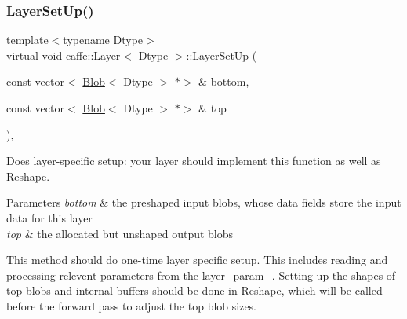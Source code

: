 \subsubsection{\texorpdfstring{Layer\+Set\+Up()}{LayerSetUp()}\hspace{0.1cm}{\footnotesize\ttfamily [2/2]}}
{\footnotesize\ttfamily template$<$typename Dtype$>$ \\
virtual void \mbox{\hyperlink{classcaffe_1_1_layer}{caffe\+::\+Layer}}$<$ Dtype $>$\+::Layer\+Set\+Up (\begin{DoxyParamCaption}\item[{const vector$<$ \mbox{\hyperlink{classcaffe_1_1_blob}{Blob}}$<$ Dtype $>$ $\ast$$>$ \&}]{bottom,  }\item[{const vector$<$ \mbox{\hyperlink{classcaffe_1_1_blob}{Blob}}$<$ Dtype $>$ $\ast$$>$ \&}]{top }\end{DoxyParamCaption})\hspace{0.3cm}{\ttfamily [inline]}, {\ttfamily [virtual]}}



Does layer-\/specific setup\+: your layer should implement this function as well as Reshape. 


\begin{DoxyParams}{Parameters}
{\em bottom} & the preshaped input blobs, whose data fields store the input data for this layer \\
\hline
{\em top} & the allocated but unshaped output blobs\\
\hline
\end{DoxyParams}
This method should do one-\/time layer specific setup. This includes reading and processing relevent parameters from the {\ttfamily layer\+\_\+param\+\_\+}. Setting up the shapes of top blobs and internal buffers should be done in {\ttfamily Reshape}, which will be called before the forward pass to adjust the top blob sizes. 

